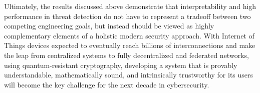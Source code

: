 \documentclass[12pt]{article}
\begin{document}
    Ultimately, the results discussed above demonstrate that interpretability and high performance in threat detection do not have to represent a tradeoff between two competing engineering goals, but instead should be viewed as highly complementary elements of a holistic modern security approach. With Internet of Things devices expected to eventually reach billions of interconnections and make the leap from centralized systems to fully decentralized and federated networks, using quantum-resistant cryptography, developing a system that is provably understandable, mathematically sound, and intrinsically trustworthy for its users will become the key challenge for the next decade in cybersecurity.

    \newpage
    
    
\end{document}
